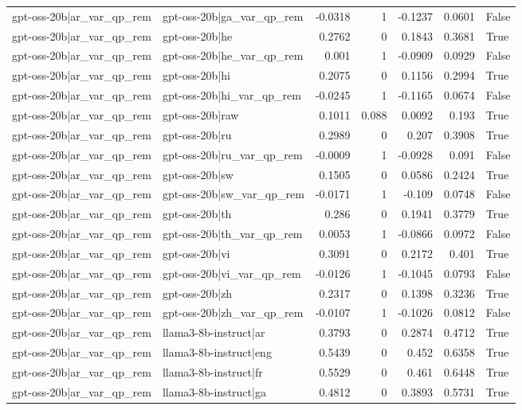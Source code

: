 \begin{table}
\begin{tabular}{l l r r r r l}
gpt-oss-20b|ar_var_qp_rem & gpt-oss-20b|ga_var_qp_rem & -0.0318 & 1 & -0.1237 & 0.0601 & False \\
gpt-oss-20b|ar_var_qp_rem & gpt-oss-20b|he & 0.2762 & 0 & 0.1843 & 0.3681 & True \\
gpt-oss-20b|ar_var_qp_rem & gpt-oss-20b|he_var_qp_rem & 0.001 & 1 & -0.0909 & 0.0929 & False \\
gpt-oss-20b|ar_var_qp_rem & gpt-oss-20b|hi & 0.2075 & 0 & 0.1156 & 0.2994 & True \\
gpt-oss-20b|ar_var_qp_rem & gpt-oss-20b|hi_var_qp_rem & -0.0245 & 1 & -0.1165 & 0.0674 & False \\
gpt-oss-20b|ar_var_qp_rem & gpt-oss-20b|raw & 0.1011 & 0.088 & 0.0092 & 0.193 & True \\
gpt-oss-20b|ar_var_qp_rem & gpt-oss-20b|ru & 0.2989 & 0 & 0.207 & 0.3908 & True \\
gpt-oss-20b|ar_var_qp_rem & gpt-oss-20b|ru_var_qp_rem & -0.0009 & 1 & -0.0928 & 0.091 & False \\
gpt-oss-20b|ar_var_qp_rem & gpt-oss-20b|sw & 0.1505 & 0 & 0.0586 & 0.2424 & True \\
gpt-oss-20b|ar_var_qp_rem & gpt-oss-20b|sw_var_qp_rem & -0.0171 & 1 & -0.109 & 0.0748 & False \\
gpt-oss-20b|ar_var_qp_rem & gpt-oss-20b|th & 0.286 & 0 & 0.1941 & 0.3779 & True \\
gpt-oss-20b|ar_var_qp_rem & gpt-oss-20b|th_var_qp_rem & 0.0053 & 1 & -0.0866 & 0.0972 & False \\
gpt-oss-20b|ar_var_qp_rem & gpt-oss-20b|vi & 0.3091 & 0 & 0.2172 & 0.401 & True \\
gpt-oss-20b|ar_var_qp_rem & gpt-oss-20b|vi_var_qp_rem & -0.0126 & 1 & -0.1045 & 0.0793 & False \\
gpt-oss-20b|ar_var_qp_rem & gpt-oss-20b|zh & 0.2317 & 0 & 0.1398 & 0.3236 & True \\
gpt-oss-20b|ar_var_qp_rem & gpt-oss-20b|zh_var_qp_rem & -0.0107 & 1 & -0.1026 & 0.0812 & False \\
gpt-oss-20b|ar_var_qp_rem & llama3-8b-instruct|ar & 0.3793 & 0 & 0.2874 & 0.4712 & True \\
gpt-oss-20b|ar_var_qp_rem & llama3-8b-instruct|eng & 0.5439 & 0 & 0.452 & 0.6358 & True \\
gpt-oss-20b|ar_var_qp_rem & llama3-8b-instruct|fr & 0.5529 & 0 & 0.461 & 0.6448 & True \\
gpt-oss-20b|ar_var_qp_rem & llama3-8b-instruct|ga & 0.4812 & 0 & 0.3893 & 0.5731 & True \\

\end{tabular}
\end{table}
